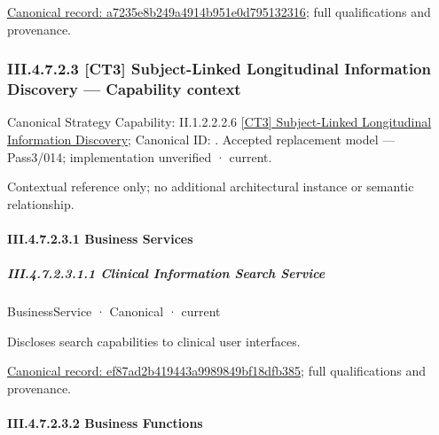{\footnotesize \href{../../../../../../../continuum/business/business-function/a7235e8b249a4914b951e0d795132316.md}{Canonical record: a7235e8b249a4914b951e0d795132316}; full qualifications and provenance.}\par
\subsubsection*{III.4.7.2.3 [CT3] Subject-Linked Longitudinal Information Discovery — Capability context}
\label{navigation:III.4.7.2.3}

{\small Canonical Strategy Capability: II.1.2.2.2.6 \hyperref[element:645372b4e7eb431d916ff3254f11689b]{[CT3] Subject-Linked Longitudinal Information Discovery}; Canonical ID: \texttt{}. Accepted replacement model — Pass3/014; implementation unverified · current.}\par
Contextual reference only; no additional architectural instance or semantic relationship.\par
\paragraph*{III.4.7.2.3.1 Business Services}
\label{navigation:III.4.7.2.3.1}

\subparagraph*{III.4.7.2.3.1.1 Clinical Information Search Service}
\label{navigation:III.4.7.2.3.1.1}

\label{element:ef87ad2b419443a9989849bf18dfb385}
{\small BusinessService · Canonical · current}\par

Discloses search capabilities to clinical user interfaces.


{\footnotesize \href{../../../../../../../continuum/business/business-service/ef87ad2b419443a9989849bf18dfb385.md}{Canonical record: ef87ad2b419443a9989849bf18dfb385}; full qualifications and provenance.}\par
\paragraph*{III.4.7.2.3.2 Business Functions}
\label{navigation:III.4.7.2.3.2}

